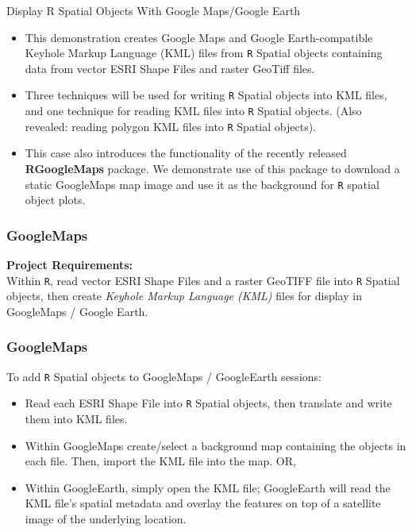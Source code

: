 \documentclass{beamer}
\begin{document}
\begin{frame}[fragile]
\huge
Display R Spatial Objects With Google Maps/Google Earth

\end{frame}
\begin{frame}[fragile]
\begin{itemize}
\item This demonstration creates Google Maps and Google Earth-compatible Keyhole Markup Language (KML) files from \texttt{R} Spatial objects containing data from vector ESRI Shape Files and raster GeoTiff files. 

\item Three techniques will be used for writing \texttt{R} Spatial objects into KML files, and one technique for reading KML files into \texttt{R} Spatial objects. 
(Also revealed: reading polygon KML files into \texttt{R} Spatial objects).

\item This case also introduces the functionality of the recently released \textbf{RGoogleMaps} package. We demonstrate use of this package to download a static GoogleMaps map image and use it as the background for \texttt{R} spatial object plots. 
\end{itemize}
\end{frame}
\begin{frame}[fragile]
\frametitle{GoogleMaps}

\textbf{Project Requirements:}\\
Within \texttt{R}, read vector ESRI Shape Files and a raster GeoTIFF file into \texttt{R} Spatial 
objects, then create \textit{Keyhole Markup Language (KML)} files for display in GoogleMaps / Google Earth.

\end{frame}
\begin{frame}[fragile]
\frametitle{GoogleMaps}
To add \texttt{R} Spatial objects to GoogleMaps / GoogleEarth sessions:
\begin{itemize}
\item  Read each ESRI Shape File into \texttt{R} Spatial objects, then translate and write them into KML files.
\item  Within GoogleMaps create/select a background map containing the objects in each file. Then, import the KML file into the map. OR,
\item  Within GoogleEarth, simply open the KML file; GoogleEarth will read the KML file's spatial metadata and overlay the features on top of a satellite image of the underlying location.
\end{itemize}
\end{frame}
\end{document}
